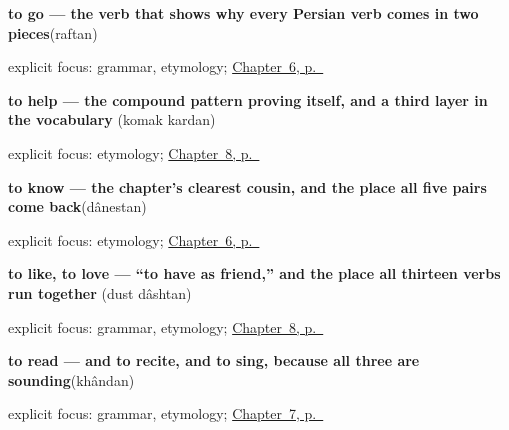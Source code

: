 \noindent\begin{minipage}[t]{\linewidth}
\raggedright
\textbf{to go — the verb that shows why every Persian verb comes in two pieces}\enspace\emph{}\enspace(raftan)\par
\footnotesize explicit focus: grammar, etymology; \hyperref[ch:fa-core-verbs]{Chapter~6, p.~\pageref*{ch:fa-core-verbs}}
\end{minipage}\par\smallskip

\noindent\begin{minipage}[t]{\linewidth}
\raggedright
\textbf{to help — the compound pattern proving itself, and a third layer in the vocabulary}\enspace\emph{ }\enspace(komak kardan)\par
\footnotesize explicit focus: etymology; \hyperref[ch:fa-doing-verbs]{Chapter~8, p.~\pageref*{ch:fa-doing-verbs}}
\end{minipage}\par\smallskip

\noindent\begin{minipage}[t]{\linewidth}
\raggedright
\textbf{to know — the chapter's clearest cousin, and the place all five pairs come back}\enspace\emph{}\enspace(dânestan)\par
\footnotesize explicit focus: etymology; \hyperref[ch:fa-core-verbs]{Chapter~6, p.~\pageref*{ch:fa-core-verbs}}
\end{minipage}\par\smallskip

\noindent\begin{minipage}[t]{\linewidth}
\raggedright
\textbf{to like, to love — “to have as friend,” and the place all thirteen verbs run together}\enspace\emph{ }\enspace(dust dâshtan)\par
\footnotesize explicit focus: grammar, etymology; \hyperref[ch:fa-doing-verbs]{Chapter~8, p.~\pageref*{ch:fa-doing-verbs}}
\end{minipage}\par\smallskip

\noindent\begin{minipage}[t]{\linewidth}
\raggedright
\textbf{to read — and to recite, and to sing, because all three are sounding}\enspace\emph{}\enspace(khândan)\par
\footnotesize explicit focus: grammar, etymology; \hyperref[ch:fa-mind-verbs]{Chapter~7, p.~\pageref*{ch:fa-mind-verbs}}
\end{minipage}\par\smallskip

